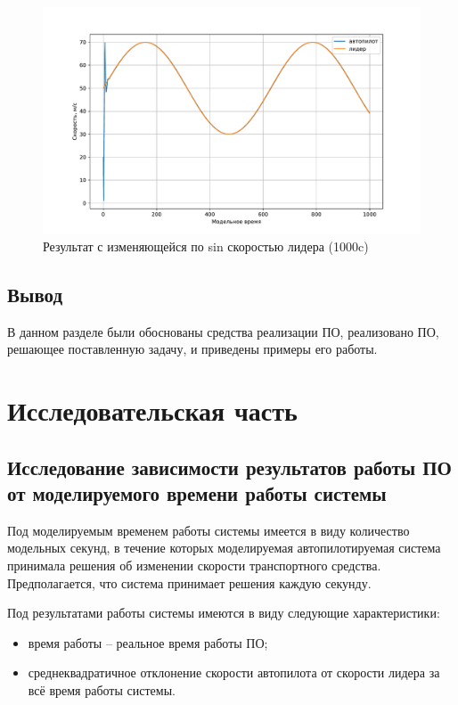 \documentclass[12pt]{report}
\begin{document}
\begin{figure}[h!]
  \centering
  \includegraphics[scale = 0.62]{result_sin_leader_1000.pdf}
  \caption{Результат с изменяющейся по sin скоростью лидера (1000c)}
  \label{fig:sin_leader_1000}
\end{figure}
\section*{Вывод}
В данном разделе были обоснованы средства реализации ПО, реализовано ПО, решающее поставленную задачу, и приведены примеры его работы.

\chapter{Исследовательская часть}

\section{Исследование зависимости результатов работы ПО от моделируемого времени работы системы}

Под моделируемым временем работы системы имеется в виду количество модельных секунд, в течение которых моделируемая автопилотируемая система принимала решения об изменении скорости транспортного средства. 
Предполагается, что система принимает решения каждую секунду. 

Под результатами работы системы имеются в виду следующие характеристики:
\begin{itemize}
    \item время работы -- реальное время работы ПО;
    \item среднеквадратичное отклонение скорости автопилота от скорости лидера за всё время работы системы.
\end{itemize}
\end{document}
